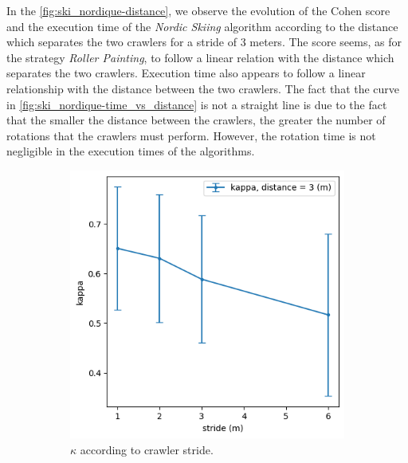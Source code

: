 In the \ref{fig:ski_nordique-distance}, we observe the evolution of the Cohen score and the execution time of the \textit{Nordic Skiing} algorithm according to the distance which separates the two crawlers for a stride of 3 meters.
The score seems, as for the strategy \textit{Roller Painting}, to follow a linear relation with the distance which separates the two crawlers.
Execution time also appears to follow a linear relationship with the distance between the two crawlers.
The fact that the curve in \ref{fig:ski_nordique-time_vs_distance} is not a straight line is due to the fact that the smaller the distance between the crawlers, the greater the number of rotations that the crawlers must perform.
However, the rotation time is not negligible in the execution times of the algorithms.

\begin{figure}[h!]
	\begin{subfigure}[t]{0.49\linewidth}
		\includegraphics[width=\linewidth]{graphics/ski_nordique-kappa_vs_stride.png}
		\caption{$\kappa$ according to crawler stride.}
		\label{fig:ski_nordique-kappa_vs_stride}
	\end{subfigure}
	\hfill
	\begin{subfigure}[t]{0.49\linewidth}

\end{subfigure}
\end{figure}
